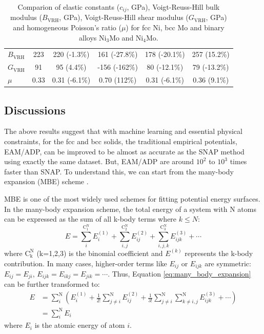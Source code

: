 \documentclass[prb,reprint,superscriptaddress]{revtex4-2}
\begin{document}
\begin{table}
\begin{tabular}{lccccc}
$B_{\mathrm{VRH}}$ & 223  & 220 (-1.3\%)     & 161 (-27.8\%)   & 178 (-20.1\%) & 257 (15.2\%)  \\
$G_{\mathrm{VRH}}$ & 91   & 95 (4.4\%)       & -156 (-162\%)   & 80 (-12.1\%)  & 79 (-13.2\%)  \\
$\mu$              & 0.33 & 0.31 (-6.1\%)    & 0.70 (112\%)    & 0.31 (-6.1\%) & 0.36 (9.1\%)  \\
\hline
\end{tabular}
\caption{\label{table:NiMo_elastic_constants}
Comparion of elastic constants ($c_{ij}$, GPa), Voigt-Reuss-Hill bulk modulus 
($B_{\mathrm{VRH}}$, GPa), Voigt-Reuss-Hill shear modulus ($G_{\mathrm{VRH}}$, 
GPa) and homogeneous Poisson's ratio ($\mu$) for fcc Ni, bcc Mo and binary 
alloys Ni$_{3}$Mo and Ni$_{4}$Mo.
}
\end{table}

% 
%
\subsection{Discussions}
\label{sec:discussions}

The above results suggest that with machine learning and essential physical 
constraints, for the fcc and bcc solids, the traditional empirical potentials, 
EAM/ADP, can be improved to be almost as accurate as the SNAP method using 
exactly the same dataset. But, EAM/ADP are around $10^2$ to $10^3$ times faster 
than SNAP. To understand this, we can start from the many-body expansion (MBE) 
scheme \cite{kCON}.

MBE is one of the most widely used schemes for fitting potential energy 
surfaces. In the many-body expansion scheme, the total energy of a system with N 
atoms can be expressed as the sum of all k-body terms where $k \le N$:
\begin{equation}
\label{eq:many_body_expansion}
E = 
\sum_{i}^{\mathrm{C^N_1}}{E^{(1)}_{i}} +
\sum_{i,j}^{\mathrm{C^N_2}}{E^{(2)}_{ij}} + 
\sum_{i,j,k}^{\mathrm{C^N_3}}{E^{(3)}_{ijk}} + \cdots 
\end{equation}
where $\mathrm{C^N_k}$ (k=1,2,3) is the binomial coefficient and $E^{(k)}$ 
represents the k-body contribution. In many cases, higher-order terms like 
$E_{ij}$ or 
$E_{ijk}$ are symmetric: $E_{ij}=E_{ji}$, $E_{ijk}=E_{ikj}=E_{jik}=\cdots$. 
Thus, Equation \ref{eq:many_body_expansion} can be further transformed to:
\begin{align}
\label{eq:MBE_atomic}
E & = \sum_{i}^{\mathrm{N}}{\left(
    E^{(1)}_{i} + 
    \frac{1}{2!}\sum_{j \ne i}^{\mathrm{N}}{E^{(2)}_{ij}} +
    \frac{1}{3!}\sum_{j \ne i}^{\mathrm{N}}{
        \sum_{k \ne i,j}^{\mathrm{N}}{E^{(3)}_{ijk}}
    } +
    \cdots
\right)} \nonumber \\
& = \sum_{i}^{\mathrm{N}}{E_{i}}
\end{align}
where $E_{i}$ is the atomic energy of atom $i$. 
\end{document}
